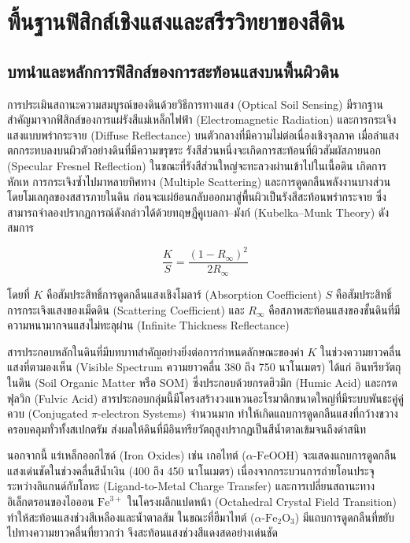 \chapter{พื้นฐานฟิสิกส์เชิงแสงและสรีรวิทยาของสีดิน}
\label{ch:foundations}

\section{บทนำและหลักการฟิสิกส์ของการสะท้อนแสงบนพื้นผิวดิน}

การประเมินสถานะความสมบูรณ์ของดินด้วยวิธีการทางแสง (Optical Soil Sensing) มีรากฐานสำคัญมาจากฟิสิกส์ของการแผ่รังสีแม่เหล็กไฟฟ้า (Electromagnetic Radiation) และการกระเจิงแสงแบบพร่ากระจาย (Diffuse Reflectance) บนตัวกลางที่มีความไม่ต่อเนื่องเชิงจุลภาค เมื่อลำแสงตกกระทบลงบนผิวตัวอย่างดินที่มีความขรุขระ รังสีส่วนหนึ่งจะเกิดการสะท้อนที่ผิวสัมผัสภายนอก (Specular Fresnel Reflection) ในขณะที่รังสีส่วนใหญ่จะทะลวงผ่านเข้าไปในเนื้อดิน เกิดการหักเห การกระเจิงซ้ำไปมาหลายทิศทาง (Multiple Scattering) และการดูดกลืนพลังงานบางส่วนโดยโมเลกุลของสสารภายในดิน ก่อนจะแผ่ย้อนกลับออกมาสู่พื้นผิวเป็นรังสีสะท้อนพร่ากระจาย ซึ่งสามารถจำลองปรากฏการณ์ดังกล่าวได้ด้วยทฤษฎีคูเบลกา--มังก์ (Kubelka--Munk Theory) ดังสมการ

\begin{equation}
\frac{K}{S} = \frac{(1 - R_\infty)^2}{2 R_\infty}
\label{eq:kubelka_munk}
\end{equation}

โดยที่ $K$ คือสัมประสิทธิ์การดูดกลืนแสงเชิงโมลาร์ (Absorption Coefficient) $S$ คือสัมประสิทธิ์การกระเจิงแสงของเม็ดดิน (Scattering Coefficient) และ $R_\infty$ คือสภาพสะท้อนแสงของชั้นดินที่มีความหนามากจนแสงไม่ทะลุผ่าน (Infinite Thickness Reflectance)

สารประกอบหลักในดินที่มีบทบาทสำคัญอย่างยิ่งต่อการกำหนดลักษณะของค่า $K$ ในช่วงความยาวคลื่นแสงที่ตามองเห็น (Visible Spectrum ความยาวคลื่น 380 ถึง 750 นาโนเมตร) ได้แก่ อินทรียวัตถุในดิน (Soil Organic Matter หรือ SOM) ซึ่งประกอบด้วยกรดฮิวมิก (Humic Acid) และกรดฟุลวิก (Fulvic Acid) สารประกอบกลุ่มนี้มีโครงสร้างวงแหวนอะโรมาติกขนาดใหญ่ที่มีระบบพันธะคู่คู่ควบ (Conjugated $\pi$-electron Systems) จำนวนมาก ทำให้เกิดแถบการดูดกลืนแสงที่กว้างขวางครอบคลุมทั่วทั้งสเปกตรัม ส่งผลให้ดินที่มีอินทรียวัตถุสูงปรากฏเป็นสีน้ำตาลเข้มจนถึงดำสนิท

นอกจากนี้ แร่เหล็กออกไซด์ (Iron Oxides) เช่น เกอไทต์ ($\alpha\text{-FeOOH}$) จะแสดงแถบการดูดกลืนแสงเด่นชัดในช่วงคลื่นสีน้ำเงิน (400 ถึง 450 นาโนเมตร) เนื่องจากกระบวนการถ่ายโอนประจุระหว่างลิแกนด์กับโลหะ (Ligand-to-Metal Charge Transfer) และการเปลี่ยนสถานะทางอิเล็กตรอนของไอออน $\text{Fe}^{3+}$ ในโครงผลึกแปดหน้า (Octahedral Crystal Field Transition) ทำให้สะท้อนแสงช่วงสีเหลืองและน้ำตาลส้ม ในขณะที่ฮีมาไทต์ ($\alpha\text{-Fe}_2\text{O}_3$) มีแถบการดูดกลืนที่ขยับไปทางความยาวคลื่นที่ยาวกว่า จึงสะท้อนแสงช่วงสีแดงสดอย่างเด่นชัด


